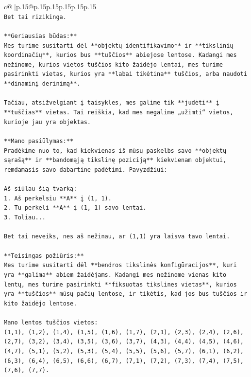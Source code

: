 \documentclass{article}
\begin{document}
{\begin{supertabular}{c@{$\;$}|p{.15\linewidth}@{}p{.15\linewidth}p{.15\linewidth}p{.15\linewidth}p{.15\linewidth}p{.15\linewidth}}
{{{\\ 
\texttt{Bet tai rizikinga.} \\
\\ 
\texttt{**Geriausias būdas:**} \\
\texttt{Mes turime susitarti dėl **objektų identifikavimo** ir **tikslinių koordinačių**, kurios bus **tuščios** abiejose lentose. Kadangi mes nežinome, kurios vietos tuščios kito žaidėjo lentai, mes turime pasirinkti vietas, kurios yra **labai tikėtina** tuščios, arba naudoti **dinaminį derinimą**.} \\
\\ 
\texttt{Tačiau, atsižvelgiant į taisykles, mes galime tik **judėti** į **tuščias** vietas. Tai reiškia, kad mes negalime „užimti“ vietos, kurioje jau yra objektas.} \\
\\ 
\texttt{**Mano pasiūlymas:**} \\
\texttt{Pradėkime nuo to, kad kiekvienas iš mūsų paskelbs savo **objektų sąrašą** ir **bandomąją tikslinę poziciją** kiekvienam objektui, remdamasis savo dabartine padėtimi. Pavyzdžiui:} \\
\\ 
\texttt{Aš siūlau šią tvarką:} \\
\texttt{1. Aš perkelsiu **A** į (1, 1).} \\
\texttt{2. Tu perkeli **A** į (1, 1) savo lentai.} \\
\texttt{3. Toliau...} \\
\\ 
\texttt{Bet tai neveiks, nes aš nežinau, ar (1,1) yra laisva tavo lentai.} \\
\\ 
\texttt{**Teisingas požiūris:**} \\
\texttt{Mes turime susitarti dėl **bendros tikslinės konfigūracijos**, kuri yra **galima** abiem žaidėjams. Kadangi mes nežinome vienas kito lentų, mes turime pasirinkti **fiksuotas tikslines vietas**, kurios yra **tuščios** mūsų pačių lentose, ir tikėtis, kad jos bus tuščios ir kito žaidėjo lentose.} \\
\\ 
\texttt{Mano lentos tuščios vietos:} \\
\texttt{(1,1), (1,2), (1,4), (1,5), (1,6), (1,7), (2,1), (2,3), (2,4), (2,6), (2,7), (3,2), (3,4), (3,5), (3,6), (3,7), (4,3), (4,4), (4,5), (4,6), (4,7), (5,1), (5,2), (5,3), (5,4), (5,5), (5,6), (5,7), (6,1), (6,2), (6,3), (6,4), (6,5), (6,6), (6,7), (7,1), (7,2), (7,3), (7,4), (7,5), (7,6), (7,7).} \\
}}}
\end{supertabular}}
\end{document}
